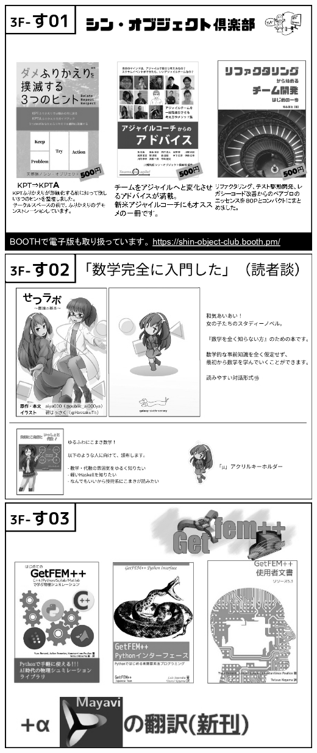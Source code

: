 \begin{center}
\includegraphics[width=0.9\linewidth]{images/circle-appeals/3F-す01.jpg}
\includegraphics[width=0.9\linewidth]{images/circle-appeals/3F-す02.jpg}
\includegraphics[width=0.9\linewidth]{images/circle-appeals/3F-す03.jpg}

\end{center}
